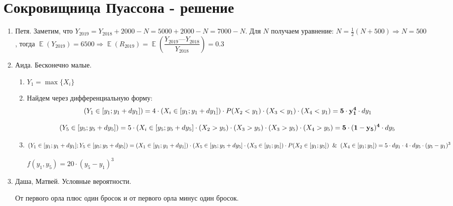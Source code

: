 \documentclass[a4paper,12pt]{article}
\DeclareMathOperator{\E}{\mathbb{E}}
\let\P\relax
\DeclareMathOperator{\P}{\mathbb{P}}
\begin{document}
\newpage
\section{Сокровищница Пуассона - решение}

\begin{enumerate}
\item Петя.
Заметим, что $Y_{2019} = Y_{2018} + 2000 - N = 5000 + 2000 - N = 7000 - N$. Для $N$ получаем уравнение: $N = \frac{1}{2}(N + 500) \Rightarrow N = 500$, тогда $\E(Y_{2019}) = 6500 \Rightarrow \E(R_{2019}) = \E\left(\dfrac{Y_{2019} — Y_{2018}}{Y_{2018}}\right) = 0.3$
\item Аида. Бесконечно малые.
\begin{enumerate}
\item $Y_1=\max\{X_i\}$
\item Найдем через дифференциальную форму:
\[
\P(Y_1 \in [y_1;y_1+dy_1])=4\cdot \P (X_i \in [y_1;y_1+dy_1]) \cdot P(X_2<y_1) \cdot \P(X_3<y_1) \cdot \P(X_4<y_1) = \mathbf{5\cdot y_1^4} \cdot dy_1
\]

\[
\P(Y_5 \in [y_5;y_5+dy_5])= 5\cdot \P(X_i \in [y_5;y_5+dy_5] \cdot \P(X_2>y_5) \cdot \P(X_3>y_5) \cdot \P(X_3>y_5) \cdot \P(X_4>y_5)=\mathbf{5\cdot (1-y_5)^4} \cdot dy_5
\]

\item
\[
\P(Y_1 \in [y_1;y_1+dy_1];Y_5 \in [y_5;y_5+dy_5] )= \P(X_1 \in [y_1;y_1+dy_1])\cdot \P(X_5 \in [y_5;y_5+dy_5] \cdot \P(X_3 \in [y_1;y_5]) \cdot  P(X_2 \in [y_1;y_5])\And  \P(X_4 \in [y_1;y_5]) = 5 \cdot dy_1 \cdot 4 \cdot dy_5 \cdot (y_5-y_1)^3
\]

$f(y_1, y_5)= 20 \cdot (y_5-y_1)^3$
\end{enumerate}

\item Даша, Матвей. Условные вероятности.

От первого орла плюс один бросок и от первого орла минус один бросок.
\end{enumerate}
\end{document}
